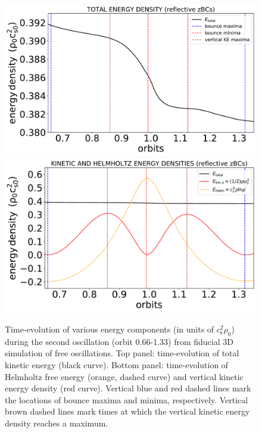 \documentclass[fleqn,usenatbib]{mnras}
\begin{document}
\begin{figure}
\centering
\includegraphics[scale=0.3]{Figures/figure00PRODUCTION_VSTRHYDRORes32Re4687H6BounceHigherCadenceOrb0toOrb4_totalenergydensity_2ndbounce}
\includegraphics[scale=0.3]{Figures/figure00PRODUCTION_VSTRHYDRORes32Re4687H6BounceHigherCadenceOrb0toOrb4_energydensities_2ndbounce}
\caption{Time-evolution of various energy components (in units of $c_\text{s}^2 \rho_0$) during the second oscillation (orbit 0.66-1.33) from fiducial 3D simulation of free oscillations. Top panel: time-evolution of total kinetic energy (black curve). Bottom panel: time-evolution of Helmholtz free energy (orange, dashed curve) and vertical kinetic energy density (red curve). Vertical blue and red dashed lines mark the locations of bounce maxima and minima, respectively. Vertical brown dashed lines mark times at which the vertical kinetic energy density reaches a maximum.}
\label{FIGURE_FiducialFreeBounceEnergiesFirstFewBoucnes}
\end{figure}
\end{document}
